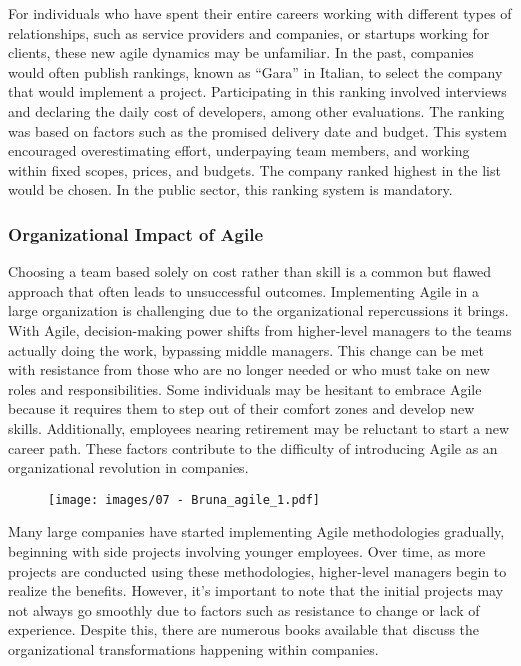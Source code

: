 For individuals who have spent their entire careers working with
different types of relationships, such as service providers and
companies, or startups working for clients, these new agile dynamics may
be unfamiliar. In the past, companies would often publish rankings,
known as ``Gara'' in Italian, to select the company that would implement
a project. Participating in this ranking involved interviews and
declaring the daily cost of developers, among other evaluations. The
ranking was based on factors such as the promised delivery date and
budget. This system encouraged overestimating effort, underpaying team
members, and working within fixed scopes, prices, and budgets. The
company ranked highest in the list would be chosen. In the public
sector, this ranking system is mandatory.

\subsubsection{Organizational Impact of Agile}

Choosing a team based solely on cost rather than skill is a common but
flawed approach that often leads to unsuccessful outcomes. Implementing
Agile in a large organization is challenging due to the organizational
repercussions it brings. With Agile, decision-making power shifts from
higher-level managers to the teams actually doing the work, bypassing
middle managers. This change can be met with resistance from those who
are no longer needed or who must take on new roles and responsibilities.
Some individuals may be hesitant to embrace Agile because it requires
them to step out of their comfort zones and develop new skills.
Additionally, employees nearing retirement may be reluctant to start a
new career path. These factors contribute to the difficulty of
introducing Agile as an organizational revolution in companies.

\begin{figure}[!h]
  \centering
  \texttt{[image: images/07 - Bruna\_agile\_1.pdf]}
\end{figure}

Many large companies have started implementing Agile methodologies
gradually, beginning with side projects involving younger employees.
Over time, as more projects are conducted using these methodologies,
higher-level managers begin to realize the benefits. However, it's
important to note that the initial projects may not always go smoothly
due to factors such as resistance to change or lack of experience.
Despite this, there are numerous books available that discuss the
organizational transformations happening within companies.

